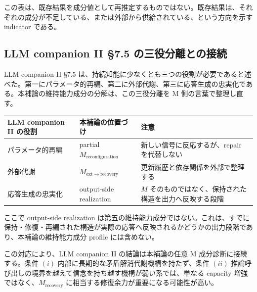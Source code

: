 \documentclass[12pt,a4paper]{article}
\begin{document}
この表は、既存結果を成分値として再推定するものではない。既存結果は、それぞれの成分が不足している、または外部から供給されている、という方向を示す indicator である。

\subsection{LLM companion II §7.5 の三役分離との接続}\label{llm-companion-ii-7.5-ux306eux4e09ux5f79ux5206ux96e2ux3068ux306eux63a5ux7d9a}

LLM companion II §7.5 は、持続知能に少なくとも三つの役割が必要であると述べた。第一にパラメータ的再編、第二に外部代謝、第三に応答生成の忠実化である。本補論の維持能力成分の分解は、この三役分離を M 側の言葉で整理し直す。

{\def\LTcaptype{table} %
\begin{longtable}[]{@{}
  >{\raggedright\arraybackslash}p{}
  >{\raggedright\arraybackslash}p{}
  >{\raggedright\arraybackslash}p{}@{}}
\toprule\noalign{}
\begin{minipage}[b]{\linewidth}\raggedright
LLM companion II の役割
\end{minipage} & \begin{minipage}[b]{\linewidth}\raggedright
本補論の位置づけ
\end{minipage} & \begin{minipage}[b]{\linewidth}\raggedright
注意
\end{minipage} \\
\midrule\noalign{}
\endhead
\bottomrule\noalign{}
\endlastfoot
パラメータ的再編 & partial \(M_{\mathrm{reconfiguration}}\) & 新しい信号に反応するが、repair を代替しない \\
外部代謝 & \(M_{\mathrm{ext}\to\mathrm{recovery}}\) & 更新履歴と依存関係を外部で整理する \\
応答生成の忠実化 & output-side realization & \(M\) そのものではなく、保持された構造を出力へ反映する段階 \\
\end{longtable}
}

ここで output-side realization は第五の維持能力成分ではない。これは、すでに保持・修復・再編された構造が実際の応答へ反映されるかどうかの出力段階であり、本補論の維持能力成分 profile には含めない。

この対応により、LLM companion II の結論は本補論の任意 M 成分診断に接続する。条件 \((i)\) 内部に長期的な矛盾解消代謝機構を持たず、条件 \((ii)\) 推論呼び出しの境界を越えて信念を持ち越す機構が弱い系では、単なる capacity 増強ではなく、\(M_{\mathrm{recovery}}\) に相当する修復余力が重要になる可能性が高い。
\end{document}
